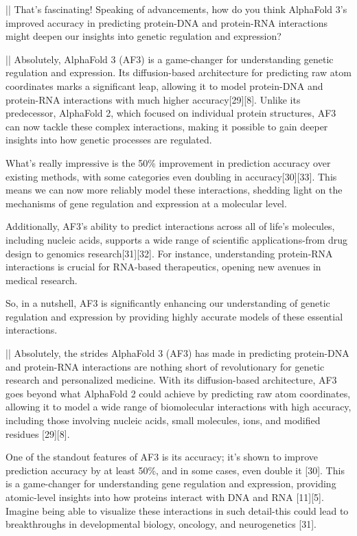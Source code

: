 \begin{showcase}[title=Topic: AlphaFold 3]
|\moderatorbg{\moderator:}|
That's fascinating! Speaking of advancements, how do you think AlphaFold 3's improved accuracy in predicting protein-DNA and protein-RNA interactions might deepen our insights into genetic regulation and expression?

||
Absolutely, AlphaFold 3 (AF3) is a game-changer for understanding genetic regulation and expression. Its diffusion-based architecture for predicting raw atom coordinates marks a significant leap, allowing it to model protein-DNA and protein-RNA interactions with much higher accuracy[29][8]. Unlike its predecessor, AlphaFold 2, which focused on individual protein structures, AF3 can now tackle these complex interactions, making it possible to gain deeper insights into how genetic processes are regulated.

What's really impressive is the 50\% improvement in prediction accuracy over existing methods, with some categories even doubling in accuracy[30][33]. This means we can now more reliably model these interactions, shedding light on the mechanisms of gene regulation and expression at a molecular level.

Additionally, AF3's ability to predict interactions across all of life's molecules, including nucleic acids, supports a wide range of scientific applications-from drug design to genomics research[31][32]. For instance, understanding protein-RNA interactions is crucial for RNA-based therapeutics, opening new avenues in medical research. 

So, in a nutshell, AF3 is significantly enhancing our understanding of genetic regulation and expression by providing highly accurate models of these essential interactions.

||
Absolutely, the strides AlphaFold 3 (AF3) has made in predicting protein-DNA and protein-RNA interactions are nothing short of revolutionary for genetic research and personalized medicine. With its diffusion-based architecture, AF3 goes beyond what AlphaFold 2 could achieve by predicting raw atom coordinates, allowing it to model a wide range of biomolecular interactions with high accuracy, including those involving nucleic acids, small molecules, ions, and modified residues [29][8].

One of the standout features of AF3 is its accuracy; it's shown to improve prediction accuracy by at least 50\%, and in some cases, even double it [30]. This is a game-changer for understanding gene regulation and expression, providing atomic-level insights into how proteins interact with DNA and RNA [11][5]. Imagine being able to visualize these interactions in such detail-this could lead to breakthroughs in developmental biology, oncology, and neurogenetics [31].


\end{showcase}
